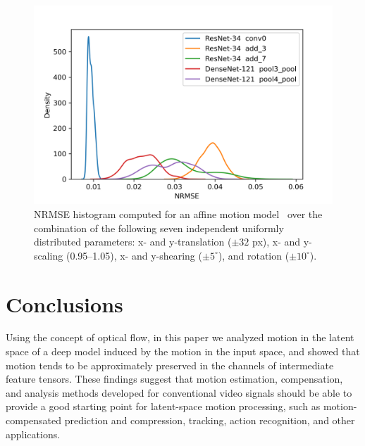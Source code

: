 \begin{figure}[htbp]
    \centering
    \includegraphics[width=\linewidth]{img/video_latent_space_motion_analysis/nrmse/random.png}
    \caption{%
        NRMSE histogram computed for an affine motion model~\cite{wang_etal_2002} over the combination of the following seven independent uniformly distributed parameters: x- and y-translation ($\pm 32$ px), x- and y-scaling (0.95--1.05), x- and y-shearing ($\pm 5^{\circ}$), and rotation ($\pm 10^{\circ}$).%
    }
    \label{fig:video_latent_space_motion_analysis/mse/histogram}
\end{figure}




\section{Conclusions}
\label{sec:video_latent_space_motion_analysis/conclusions}
Using the concept of optical flow, in this paper we analyzed motion in the latent space of a deep model induced by the motion in the input space, and showed that motion tends to be approximately preserved in the channels of intermediate feature tensors. These findings suggest that motion estimation, compensation, and analysis methods developed for conventional video signals should be able to provide a good starting point for latent-space motion processing, such as motion-compensated prediction and compression, tracking, action recognition, and other applications.

